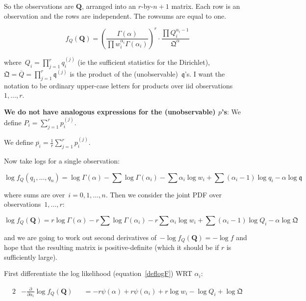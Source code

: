 \documentclass[nojss]{jss}
\begin{document}
So the observations are $\mathbf{Q}$, arranged into an $r$-by-$n+1$
matrix.  Each row is an observation and the rows are independent.  The
rowsums are equal to one.


\begin{equation}
  f_Q(\mathbf{Q})=
\left(
\frac{\Gamma(\alpha)}{\prod w_i^{\alpha_i}\Gamma(\alpha_i)}
\right)^r\cdot
\frac{\prod Q_i^{\alpha_i-1}}{\mathfrak{Q}^{\alpha}}
\end{equation}

where~$Q_i=\prod_{j=1}^r q_i^{(j)}$ (ie the sufficient statistics for
the Dirichlet), $\mathfrak{Q} =
\overline{Q}=\prod_{j=1}^r\mathfrak{q}^{(j)}$ is the product of the
(unobservable)~$\mathfrak{q}$'s.  I want the notation to be ordinary
upper-case letters for products over iid observations~$1,\ldots,r$.

{\bf We do not have analogous expressions for the (unobservable)
  $p$'s}: We define $P_i=\sum_{j=1}^r p_i^{(j)}$.

We define $\overline{p_i} = \frac{1}{r}\sum_{j=1}^r p_i^{(j)}$.

Now take logs for a single observation:

\begin{equation}
 \log f_Q(q_1,\ldots,q_n)=
  \log\Gamma(\alpha) - \sum\log\Gamma(\alpha_i) - \sum\alpha_i\log w_i
  +\sum(\alpha_i-1)\log q_i -\alpha\log\mathfrak{q}
  \end{equation}

where sums are over~$i=0,1,\ldots,n$.  Then we consider the joint PDF
over observations~$1,\ldots,r$:

\begin{equation}
  \log f_Q(\mathbf{Q}) = 
  r\log\Gamma(\alpha) - r\sum\log\Gamma(\alpha_i) - r\sum\alpha_i\log w_i
  +\sum(\alpha_i-1)\log Q_i -\alpha\log\mathfrak{Q}\label{deflogF}
\end{equation}

and we are going to work out second derivatives of~$-\log
f_Q(\mathbf{Q}) = -\log f$ and hope that the resulting matrix is
positive-definite (which it should be if $r$ is sufficiently large).

First differentiate the log likelihood (equation~\ref{deflogF}) WRT
$\alpha_i$:

\begin{alignat}{2}
& -\frac{\partial}{\partial \alpha_i}\log f_Q(\mathbf{Q}) &&=
-r\psi(\alpha)+r\psi(\alpha_i)+r\log w_i-\log Q_i +\log\mathfrak{Q}
\end{alignat}
\end{document}
